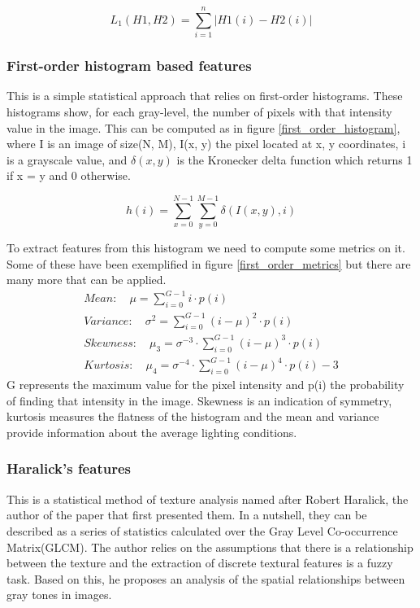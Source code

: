\documentclass[12pt]{report}
\begin{document}
	\begin{equation} \label{l1_distance}
	L_1(H1, H2) = \sum_{i=1}^{n} |H1(i) - H2(i)|
	\end{equation}
	
	\subsubsection{First-order histogram based features}
	This is a simple statistical approach that relies on first-order histograms. These histograms show, for each gray-level, the number of pixels with that intensity value in the image. This can be computed as in figure \ref{first_order_histogram}, where I is an image of size(N, M), I(x, y) the pixel located at x, y coordinates, i is a grayscale value, and $\delta(x, y)$ is the Kronecker delta function which returns 1 if x = y and 0 otherwise\cite{texture_analysis_review}.
	
	\begin{equation} \label{first_order_histogram}
	h(i) = \sum_{x=0}^{N-1}\sum_{y=0}^{M-1}\delta(I(x,y), i)
	\end{equation}
	
	To extract features from this histogram we need to compute some metrics on it. Some of these have been exemplified in figure \ref{first_order_metrics} but there are many more that can be applied.
	\begin{equation} \label{first_order_metrics}
	\begin{split}
	Mean: \quad \mu = \sum_{i=0}^{G-1}i \cdot p(i) \\
	Variance: \quad \sigma^2 = \sum_{i=0}^{G-1}(i-\mu)^2 \cdot p(i) \\
	Skewness: \quad \mu_3 = \sigma^{-3} \cdot \sum_{i=0}^{G-1}(i-\mu)^3 \cdot p(i) \\
	Kurtosis: \quad \mu_4 = \sigma^{-4} \cdot \sum_{i=0}^{G-1}(i-\mu)^4 \cdot p(i) - 3
	\end{split}
	\end{equation}
	G represents the maximum value for the pixel intensity and p(i) the probability of finding that intensity in the image. Skewness is an indication of symmetry, kurtosis measures the flatness of the histogram and the mean and variance provide information about the average lighting conditions\cite{texture_analysis_review}.
	
	\subsubsection{Haralick's features}
	This is a statistical method of texture analysis named after Robert Haralick, the author of the paper that first presented them\cite{haralick_features}. In a nutshell, they can be described as a series of statistics calculated over the Gray Level Co-occurrence Matrix(GLCM). The author relies on the assumptions that there is a relationship between the texture and the extraction of discrete textural features is a fuzzy task. Based on this, he proposes an analysis of the spatial relationships between gray tones in images.
	
\end{document}
